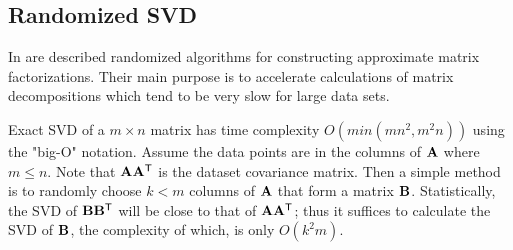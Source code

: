 \subsection{Randomized SVD}
In \cite{Holmes2007, Candes2011, Woolfe2008, Martinsson2011} are described randomized algorithms for constructing approximate matrix factorizations. Their main purpose is to accelerate calculations of matrix decompositions which tend to be very slow for large data sets.


Exact SVD of a $m \times n$ matrix has time complexity $O(min(mn^2, m^2n))$ using the "big-O" notation. Assume the data points are in the columns of $\mathbf{A}$ where $m \leq n$. Note that $\mathbf{AA^\mathsf{T}}$ is the dataset covariance matrix. Then a simple method is to randomly choose $k<m$ columns of $\mathbf{A}$ that form a matrix $\mathbf{B}$. Statistically, the SVD of $\mathbf{BB^\mathsf{T}}$ will be close to that of $\mathbf{AA^\mathsf{T}}$; thus it suffices to calculate the SVD of $\mathbf{B}$, the complexity of which, is only $O(k^2m)$.


